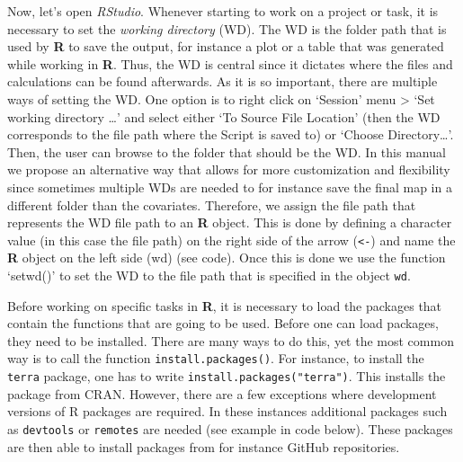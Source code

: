 \documentclass[
  10pt,
  b5paper,
  oneside]{book}
\begin{document}
Now, let's open \emph{RStudio}. Whenever starting to work on a project or task, it is necessary to set the \emph{working directory} (WD). The WD is the folder path that is used by \textbf{R} to save the output, for instance a plot or a table that was generated while working in \textbf{R}. Thus, the WD is central since it dictates where the files and calculations can be found afterwards. As it is so important, there are multiple ways of setting the WD. One option is to right click on `Session' menu \textgreater{} `Set working directory \ldots{}' and select either `To Source File Location' (then the WD corresponds to the file path where the Script is saved to) or `Choose Directory\ldots{}'. Then, the user can browse to the folder that should be the WD.
In this manual we propose an alternative way that allows for more customization and flexibility since sometimes multiple WDs are needed to for instance save the final map in a different folder than the covariates. Therefore, we assign the file path that represents the WD file path to an \textbf{R} object. This is done by defining a character value (in this case the file path) on the right side of the arrow (\texttt{\textless{}-}) and name the \textbf{R} object on the left side (wd) (see code). Once this is done we use the function `setwd()' to set the WD to the file path that is specified in the object \texttt{wd}.

Before working on specific tasks in \textbf{R}, it is necessary to load the packages that contain the functions that are going to be used. Before one can load packages, they need to be installed. There are many ways to do this, yet the most common way is to call the function \texttt{install.packages()}. For instance, to install the \texttt{terra} package, one has to write \texttt{install.packages("terra")}. This installs the package from CRAN. However, there are a few exceptions where development versions of R packages are required. In these instances additional packages such as \texttt{devtools} or \texttt{remotes} are needed (see example in code below). These packages are then able to install packages from for instance GitHub repositories.
\end{document}
